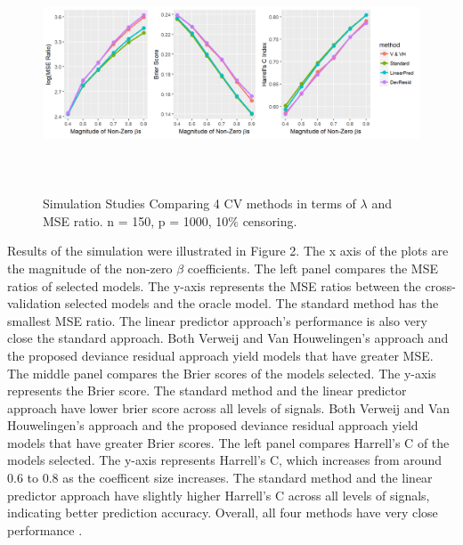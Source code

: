 \begin{figure}[h]
    \centering
		\includegraphics[height= 7cm ]{./figures/figure_2_new.png}
    \caption{Simulation Studies Comparing 4 CV methods in terms of $\lambda$ and MSE ratio. n = 150, p = 1000, 10$\%$ censoring.}
\end{figure}	


\par Results of the simulation were illustrated in Figure 2. The x axis of the plots are the magnitude of the non-zero $\beta$ coefficients. The left panel compares the MSE ratios of selected models.  The y-axis represents the MSE ratios between the cross-validation selected models and the oracle model. The standard method has the smallest MSE ratio. The linear predictor approach's performance is also very close the standard approach. Both Verweij and Van Houwelingen's approach and the proposed deviance residual approach yield models that have greater MSE. The middle panel compares the Brier scores of the models selected. The y-axis represents the Brier score. The standard method and the linear predictor approach have lower brier score across all levels of signals. Both Verweij and Van Houwelingen's approach and the proposed deviance residual approach yield models that have greater Brier scores. The left panel compares Harrell's C of the models selected. The y-axis represents Harrell's C, which increases from around 0.6 to 0.8 as the coefficent size increases. The standard method and the linear predictor approach have slightly higher Harrell's C across all levels of signals, indicating better prediction accuracy. Overall, all four methods have very close performance . 
 
